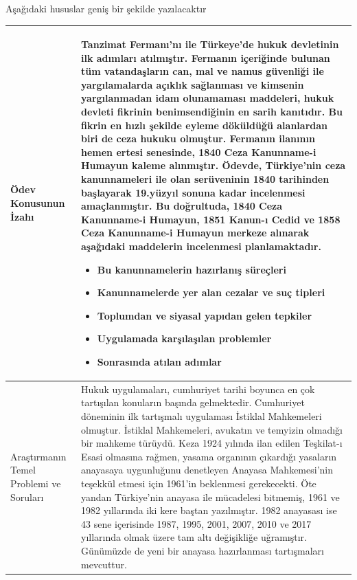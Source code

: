 \documentclass{assignment}
\begin{document}
Aşağıdaki hususlar geniş bir şekilde yazılacaktır
\begin{longtable}{|p{}|p{}|}
\hline
Ödev Konusunun İzahı &  
\hspace*{1em}Tanzimat Fermanı'nı ile Türkeye'de hukuk devletinin ilk adımları atılmıştır. Fermanın içeriğinde bulunan tüm vatandaşların can, mal ve namus güvenliği ile yargılamalarda açıklık sağlanması ve kimsenin yargılanmadan idam olunamaması maddeleri, hukuk devleti fikrinin benimsendiğinin en sarih kanıtıdır. Bu fikrin en hızlı şekilde eyleme döküldüğü alanlardan biri de ceza hukuku olmuştur. Fermanın ilanının hemen ertesi senesinde, 1840 Ceza Kanunname-i Humayun kaleme alınmıştır.\newline
\hspace*{1em}Ödevde, Türkiye'nin ceza kanunnameleri ile olan serüveninin 1840 tarihinden başlayarak 19.yüzyıl sonuna kadar incelenmesi amaçlanmıştır. Bu doğrultuda, 1840 Ceza Kanunname-i Humayun, 1851 Kanun-ı Cedid ve 1858 Ceza Kanunname-i Humayun merkeze alınarak aşağıdaki maddelerin incelenmesi planlamaktadır.
 \begin{itemize}
    \item Bu kanunnamelerin hazırlanış süreçleri
    \item Kanunnamelerde yer alan cezalar ve suç tipleri
    \item Toplumdan ve siyasal yapıdan gelen tepkiler
    \item Uygulamada karşılaşılan problemler
    \item Sonrasında atılan adımlar
\end{itemize}
\\ 
\hline
Araştırmanın Temel Problemi ve Soruları & 
\hspace*{1em}Hukuk uygulamaları, cumhuriyet tarihi boyunca en çok tartışılan konuların başında gelmektedir. Cumhuriyet döneminin ilk tartışmalı uygulaması İstiklal Mahkemeleri olmuştur. İstiklal Mahkemeleri, avukatın ve temyizin olmadığı bir mahkeme türüydü. Keza 1924 yılında ilan edilen Teşkilat-ı Esasi olmasına rağmen, yasama organının çıkardığı yasaların anayasaya uygunluğunu denetleyen Anayasa Mahkemesi'nin teşekkül etmesi için 1961'in beklenmesi gerekecekti. Öte yandan Türkiye'nin anayasa ile mücadelesi bitmemiş, 1961 ve 1982 yıllarında iki kere baştan yazılmıştır. 1982 anayasası ise 43 sene içerisinde 1987, 1995, 2001, 2007, 2010 ve 2017 yıllarında olmak üzere tam altı değişikliğe uğramıştır. Günümüzde de yeni bir anayasa hazırlanması tartışmaları mevcuttur.\newline

\end{longtable}
\end{document}
